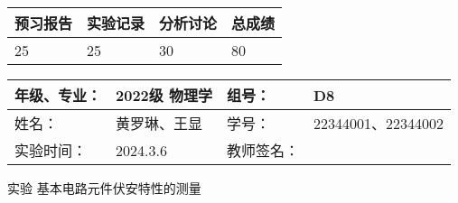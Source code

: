 \documentclass[dvipsnames, svgnames,a4paper,11pt]{article}
\begin{document}
	
	
	
	
	\begin{table}
		\renewcommand\arraystretch{1.7}
		\begin{tabularx}{\textwidth}{
				|X|X|X|X
				|X|X|X|X|}
			\hline
			\multicolumn{2}{|c|}{预习报告}&\multicolumn{2}{|c|}{实验记录}&\multicolumn{2}{|c|}{分析讨论}&\multicolumn{2}{|c|}{总成绩}\\
			\hline
			\LARGE25 & & \LARGE25 & & \LARGE30 & & \LARGE80 & \\
			\hline
		\end{tabularx}
	\end{table}
	
	\begin{table}
		\renewcommand\arraystretch{1.7}
		\begin{tabularx}{\textwidth}{|X|X|X|X|}
			\hline
			年级、专业： & 2022级 物理学 &组号： & D8\\
			\hline
			姓名： & 黄罗琳、王显 & 学号： & 22344001、22344002\\
			\hline
			实验时间： & 2024.3.6 & 教师签名： & \\
			\hline
		\end{tabularx}
	\end{table}
	
	\begin{center}
		\LARGE 实验  \quad 基本电路元件伏安特性的测量
	\end{center}
	
	
\end{document}

